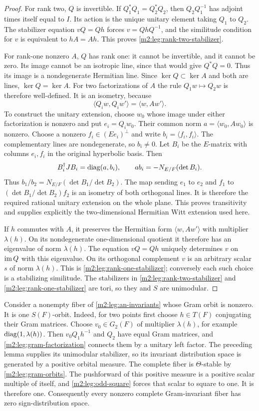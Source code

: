 \begin{proof}
For rank two, $Q$ is invertible. If $Q_1^*Q_1=Q_2^*Q_2$, then
$Q_2Q_1^{-1}$ has adjoint times itself equal to $I$. Its action is
the unique unitary element taking $Q_1$ to $Q_2$.
The stabilizer equation $vQ=Qh$ forces $v=QhQ^{-1}$, and the
similitude condition for $v$ is equivalent to $hA=Ah$.
This proves \eqref{m2:leg:rank-two-stabilizer}.

For rank-one nonzero $A$, $Q$ has rank one: it cannot be invertible,
and it cannot be zero. Its image cannot be an isotropic line,
since that would give $Q^*Q=0$. Thus its image is a nondegenerate
Hermitian line. Since $\ker Q\subset\ker A$ and both are lines,
$\ker Q=\ker A$. For two factorizations of $A$ the rule
$Q_1w\mapsto Q_2w$ is therefore well-defined. It is an isometry,
because
\[
 \langle Q_iw,Q_iw'\rangle=\langle w,Aw'\rangle.
\]
To construct the unitary extension, choose $w_0$ whose image under either factorization
is nonzero and put $e_i=Q_iw_0$. Their common norm
$a=\langle w_0,Aw_0\rangle$ is nonzero. Choose a nonzero
$f_i\in(Ee_i)^\perp$ and write $b_i=\langle f_i,f_i\rangle$.
The complementary lines are nondegenerate, so $b_i\ne0$.
Let $B_i$ be the $E$-matrix with columns $e_i,f_i$ in the original
hyperbolic basis. Then
\[
 B_i^\dagger JB_i=\operatorname{diag}(a,b_i),\qquad
 ab_i=-N_{E/F}(\det B_i).
\]
Thus $b_1/b_2=N_{E/F}(\det B_1/\det B_2)$.
The map sending $e_1$ to $e_2$ and $f_1$ to
$(\det B_1/\det B_2)f_2$ is an isometry of both orthogonal lines.
It is therefore the required rational unitary extension on the
whole plane. This proves transitivity and supplies explicitly the
two-dimensional Hermitian Witt extension used here.

If $h$ commutes with $A$, it preserves the Hermitian form
$\langle w,Aw'\rangle$ with multiplier $\lambda(h)$.
On its nondegenerate one-dimensional quotient it therefore has an
eigenvalue of norm $\lambda(h)$. The equation $vQ=Qh$ uniquely
determines $v$ on $\operatorname{im} Q$ with this eigenvalue. On its orthogonal
complement $v$ is an arbitrary scalar $s$ of norm $\lambda(h)$.
This is \eqref{m2:leg:rank-one-stabilizer}; conversely each such choice
is a stabilizing similitude. The stabilizers in \eqref{m2:leg:rank-two-stabilizer} and
\eqref{m2:leg:rank-one-stabilizer} are tori, so they and $S$ are unimodular.
\end{proof}

Consider a nonempty fiber of \eqref{m2:leg:an-invariants} whose Gram
orbit is nonzero. It is one $S(F)$-orbit. Indeed, for two points first
choose $h\in T(F)$ conjugating their Gram matrices. Choose
$v_0\in G_2(F)$ of multiplier $\lambda(h)$, for example
$\operatorname{diag}(1,\lambda(h))$. Then $v_0Q_1h^{-1}$ and $Q_2$ have equal
Gram matrices, and \cref{m2:leg:gram-factorization} connects them by
a unitary left factor.
The preceding lemma supplies its unimodular stabilizer, so its
invariant distribution space is generated by a positive orbital
measure. The complete fiber is $\Theta$-stable by
\cref{m2:leg:gram-orbits}. The pushforward of this positive measure is
a positive scalar multiple of itself, and \eqref{m2:leg:odd-square}
forces that scalar to square to one. It is therefore one.
Consequently every nonzero complete Gram-invariant fiber has zero
sign-distribution space. 

